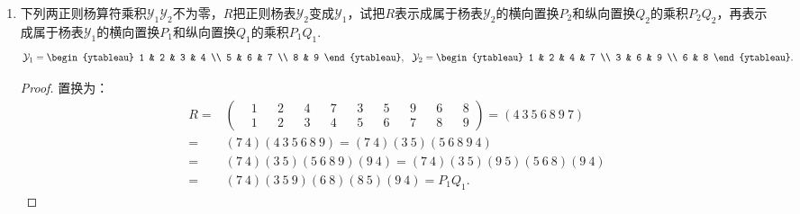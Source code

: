 \documentclass[reqno,a4paper,12pt]{amsart}
\begin{document}
\begin{enumerate}[1.]
\begin{proof}
\begin{align*}
	\begin{ytableau}
		1 & 3 \\
		2 \\
		4
	\end{ytableau} + 
	\begin{ytableau}
		1 & 3 & 4 \\
		2 \\
	\end{ytableau} + 
	\begin{ytableau}
		1 & 2 \\
		3 \\
		4
	\end{ytableau} \\
	=& 6E - 2(2 \ 3)(1 \ 4) - 2(2 \ 4)(1 \ 3) - 2(4 \ 3)(1 \ 2).
\end{align*}
\end{proof}

\item 下列两正则杨算符乘积$\mathcal{Y}_1\mathcal{Y}_2$不为零，$R$把正则杨表$\mathcal{Y}_2$变成$\mathcal{Y}_1$，试把$R$表示成属于杨表$\mathcal{Y}_2$的横向置换$P_2$和纵向置换$Q_2$的乘积$P_2Q_2$，再表示成属于杨表$\mathcal{Y}_1$的横向置换$P_1$和纵向置换$Q_1$的乘积$P_1Q_1$.
\[
	\mathcal{Y}_1 = \begin{ytableau}
		1 & 2 & 3 & 4 \\
		5 & 6 & 7 \\
		8 & 9
	\end{ytableau}, \ \ 
	\mathcal{Y}_2 = \begin{ytableau}
		1 & 2 & 4 & 7 \\
		3 & 6 & 9 \\
		6 & 8
	\end{ytableau}.
\]

\begin{proof}
置换为：
\begin{align*}
	R =& \left( \begin{aligned}
		&1 && 2 && 4 && 7 && 3 && 5 && 9 && 6 && 8 \\
		&1 && 2 && 3 && 4 && 5 && 6 && 7 && 8 && 9
	\end{aligned} \right) = (4 \ 3 \ 5 \ 6 \ 8 \ 9 \ 7) \\
	=& (7 \ 4) (4 \ 3 \ 5 \ 6 \ 8 \ 9) = (7 \ 4) (3 \ 5) (5 \ 6 \ 8 \ 9 \ 4) \\
	=& (7 \ 4) (3 \ 5) (5\ 6 \ 8 \ 9) (9 \ 4) = (7 \ 4) (3 \ 5) (9 \ 5) (5 \ 6 \ 8) (9 \ 4) \\
	=& (7 \ 4) (3 \ 5 \ 9) (6 \ 8) (8 \ 5) (9 \ 4) = P_1Q_1.
\end{align*}


\end{proof}
\end{enumerate}
\end{document}
